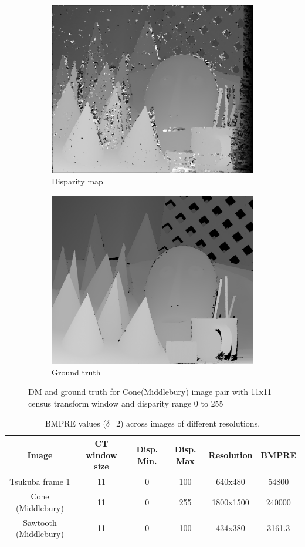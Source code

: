 \begin{figure}
\captionsetup{justification=centering}
\captionsetup[subfigure]{justification=centering}
\begin{subfigure}{.5\textwidth}
  \centering
  \includegraphics[width=.6\linewidth]{figures/ConeCT11D0-255}
  \caption{Disparity map}
  \label{fig:sfig1}
\end{subfigure}%
\begin{subfigure}{.5\textwidth}
  \centering
  \includegraphics[width=.6\linewidth]{figures/ConeGT}
  \caption{Ground truth}
  \label{fig:sfig2}
\end{subfigure}
\caption{DM and ground truth for Cone(Middlebury) image pair with 11x11 census transform window and disparity range 0 to 255}
\label{fig:dmcone}
\end{figure}

\begin{table}[!htbp]
\centering
\begin{tabular}{@{}|c|c|c|c|c|c|@{}}
\toprule
\textbf{Image}        & \textbf{CT window size} & \textbf{Disp. Min.} & \textbf{Disp. Max} & \textbf{Resolution} & \textbf{BMPRE} \\ \midrule
Tsukuba frame 1       & 11                      & 0                   & 100                & 640x480             & 54800          \\ \midrule
Cone (Middlebury)     & 11                      & 0                   & 255                & 1800x1500           & 240000         \\ \midrule
Sawtooth (Middlebury) & 11                      & 0                   & 100                & 434x380             & 3161.3         \\ \bottomrule
\end{tabular}
\caption{BMPRE values ($\delta$=2) across images of different resolutions.}
\label{tab:bmpre}
\end{table}


